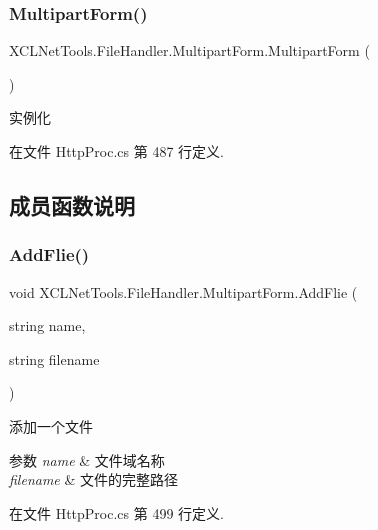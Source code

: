 \subsubsection{\texorpdfstring{Multipart\+Form()}{MultipartForm()}}
{\footnotesize\ttfamily X\+C\+L\+Net\+Tools.\+File\+Handler.\+Multipart\+Form.\+Multipart\+Form (\begin{DoxyParamCaption}{ }\end{DoxyParamCaption})}



实例化 



在文件 Http\+Proc.\+cs 第 487 行定义.



\subsection{成员函数说明}
\mbox{\label{class_x_c_l_net_tools_1_1_file_handler_1_1_multipart_form_af2601517bb4cafc5c9648945ed3e5572}} 
\subsubsection{\texorpdfstring{Add\+Flie()}{AddFlie()}\hspace{0.1cm}{\footnotesize\ttfamily [1/2]}}
{\footnotesize\ttfamily void X\+C\+L\+Net\+Tools.\+File\+Handler.\+Multipart\+Form.\+Add\+Flie (\begin{DoxyParamCaption}\item[{string}]{name,  }\item[{string}]{filename }\end{DoxyParamCaption})}



添加一个文件 


\begin{DoxyParams}{参数}
{\em name} & 文件域名称\\
\hline
{\em filename} & 文件的完整路径\\
\hline
\end{DoxyParams}


在文件 Http\+Proc.\+cs 第 499 行定义.

